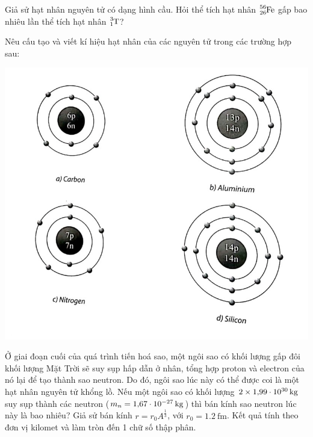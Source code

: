 \begin{ex}
	Giả sử hạt nhân nguyên tử có dạng hình cầu. Hỏi thể tích hạt nhân $\ce{_{26}^{56}Fe}$ gấp bao nhiêu lần thể tích hạt nhân $\ce{_1^3T}$?
	
\end{ex}
\begin{ex}
	Nêu cấu tạo và viết kí hiệu hạt nhân của các nguyên tử trong các trường hợp sau:
	\begin{center}
		\includegraphics[width=0.5\linewidth]{figs/VN12-Y24-PH-SYL-026P-1}
	\end{center}
\end{ex}

\begin{ex}
	Ở giai đoạn cuối của quá trình tiến hoá sao, một ngôi sao có khối lượng gấp đôi khối lượng Mặt Trời sẽ suy sụp hấp dẫn ở nhân, tổng hợp proton và electron của nó lại để tạo thành sao neutron. Do đó, ngôi sao lúc này có thể được coi là một hạt nhân nguyên tử khổng lồ. Nếu một ngôi sao có khối lượng $2\times\SI{1.99E30}{\kilogram}$ suy sụp thành các neutron ($m_n=\SI{1.67E-27}{\kilogram}$)  thì bán kính sao neutron lúc này là bao nhiêu? Giả sử bán kính $r=r_0A^{\frac{1}{3}}$, với $r_0=\SI{1.2}{\femto\meter}$. Kết quả tính theo đơn vị kilomet và làm tròn đến 1 chữ số thập phân.
\end{ex}

